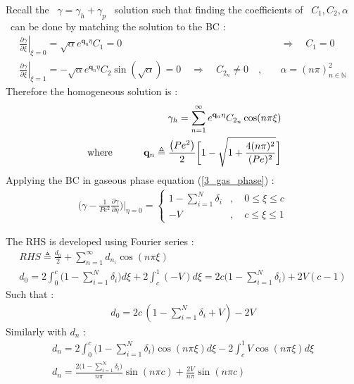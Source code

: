 \documentclass[12pt]{article}
\newcommand\tab[1][1cm]{\hspace*{#1}}
\numberwithin{equation}{section}
\begin{document}
\begin{flushleft}
Recall the \ $\gamma=\gamma_{h}+\gamma_{p}$ \ solution such that finding the coefficients of \ $C_{1}, C_{2}, \alpha$ \ can be done by matching the solution to the BC :
\begin{align} 
\left.\frac{\partial \gamma}{\partial \xi}\right|_{\xi=0}=\sqrt{\alpha} e^{\mathbf{q}_{n} \eta} C_{1}=0 & \quad \Rightarrow \quad C_{1}=0 \\
\left.\frac{\partial \gamma}{\partial \xi}\right|_{\xi=1}=-\sqrt{\alpha} e^{\mathbf{q}_{n} \eta} C_{2} \sin (\sqrt{\alpha})=0 \quad \Rightarrow \quad C_{2_{n}} \neq 0 \quad , & \quad \alpha=(n \pi)_{n \in \mathbb{N}}^{2}
\end{align}
Therefore the homogeneous solution is :
\begin{align} 
\gamma_{h}=\sum_{n=1}^{\infty} e^{\mathbf{q}_{a} \eta} C_{2_{n}} \cos (n \pi \xi) \\
\text { where } \tab  \mathbf{q}_{n} \triangleq \frac{\left(P e^{2}\right)}{2}  \bigg[1-\sqrt{1+\frac{4(n \pi)^{2}}{(P e)^{2}}} \bigg]  \label{3_qn}
\end{align} 
Applying the BC in gaseous phase equation (\ref{3_gas_phase}) :
\begin{align}
\bigg( \gamma-\frac{1}{P e^{2}} \frac{\partial \gamma}{\partial \eta} \bigg) \bigg|_{\eta=0}=\begin{cases}
1-\sum_{i=1}^{N} \delta_{i} & , \quad 0 \leq \xi \leq c \\
-V & , \quad c \leq \xi \leq 1 \end{cases}
\end{align} 

The RHS is developed using Fourier series :
\begin{align}
R H S \triangleq \frac{d_{0}}{2}+\sum_{n=1}^{\infty} d_{n_{i}} \cos (n \pi \xi) \\
d_{0}=2 \int_{0}^{c}\Big(1-\sum_{i=1}^{N} \delta_{i}\Big) d \xi+2 \int_{c}^{1}(-V) d \xi=2 c\Big(1-\sum_{i=1}^{N} \delta_{i}\Big)+2 V(c-1)
\end{align} 
Such that :
\begin{align}
d_{0}=2 c \, (1-\sum_{i=1}^{N} \delta_{i}+V )-2 V
\end{align} 
Similarly with $d_{n}$ :
\begin{align} 
d_{n}=2 \int_{0}^{c}\Big(1-\sum_{i=1}^{N} \delta_{i}\Big) \cos (n \pi \xi) d \xi-2 \int_{c}^{1} V \cos (n \pi \xi) d \xi \\
d_{n}=\frac{2\Big(1-\sum_{i=1}^{N} \delta_{i}\Big)}{n \pi} \sin (n \pi c)+\frac{2 V}{n \pi} \sin (n \pi c)
\end{align} 


\end{flushleft}
\end{document}
